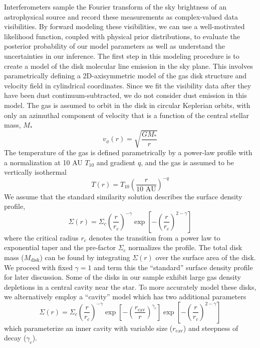 \documentclass{aastex6}
\begin{document}
Interferometers sample the Fourier transform of the sky brightness of an astrophysical source and record these measurements as complex-valued data visibilities. By forward modeling these visibilities, we can use a well-motivated likelihood function, coupled with physical prior distributions, to evaluate the posterior probability of our model parameters as well as understand the uncertainties in our inference. The first step in this modeling procedure is to create a model of the disk molecular line emission in the sky plane. This involves parametrically defining a 2D-axisymmetric model of the gas disk structure and velocity field in cylindrical coordinates. Since we fit the visibility data after they have been dust continuum-subtracted, we do not consider dust emission in this model. The gas is assumed to orbit in the disk in circular Keplerian orbits, with only an azimuthal component of velocity that is a function of the central stellar mass, $M_\ast$
\begin{equation}
	v_\phi(r) = \sqrt{\frac{G M_\ast}{r}}
\end{equation}
The temperature of the gas is defined parametrically by a power-law profile with a normalization at 10 AU $T_{10}$ and gradient $q$, and the gas is assumed to be vertically isothermal
\begin{equation}
	T(r) = T_{10} \left ( \frac{r}{\textrm{10 AU}}\right)^{-q}
\end{equation}
We assume that the standard \citet{lynden-bell74} similarity solution describes the surface density profile,
\begin{equation}
\Sigma(r) = \Sigma_c \left (\frac{r}{r_c} \right)^{- \gamma} \exp \left[ - \left(\frac{r}{r_c} \right)^{2 - \gamma} \right]
\end{equation}
 where the critical radius $r_c$ denotes the transition from a power law to exponential taper and the pre-factor $\Sigma_c$ normalizes the profile. The total disk mass ($M_\textrm{disk}$) can be found by integrating $\Sigma(r)$ over the surface area of the disk. We proceed with fixed $\gamma = 1$ and term this the ``standard'' surface density profile for later discussion. Some of the disks in our sample exhibit large gas density depletions in a central cavity near the star. To more accurately model these disks, we alternatively employ a ``cavity'' model which has two additional parameters
\begin{equation}
\Sigma(r) = \Sigma_c \left (\frac{r}{r_c} \right)^{- \gamma} \exp \left [- \left ( \frac{r_\mathrm{cav}}{r} \right)^{\gamma_c} \right ]  \exp \left[ - \left(\frac{r}{r_c} \right)^{2 - \gamma} \right]
\end{equation}
which parameterize an inner cavity with variable size ($r_\mathrm{cav}$) and steepness of decay ($\gamma_c$).
\end{document}

